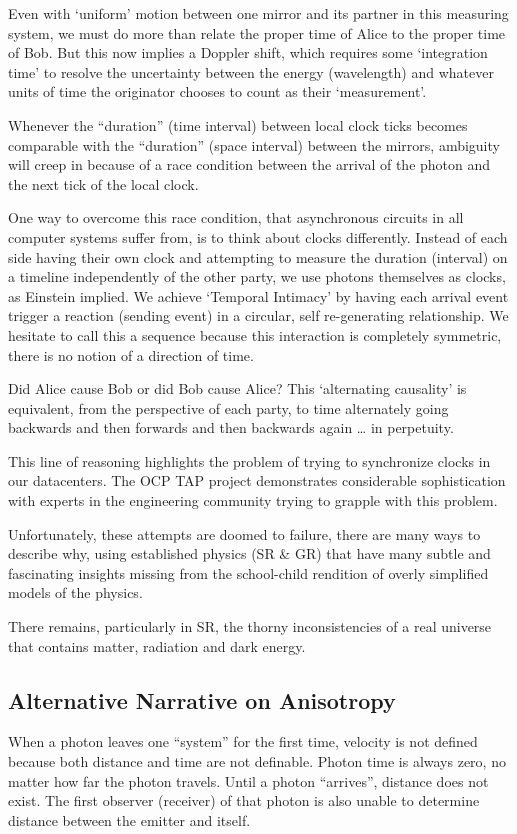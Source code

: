 Even with ‘uniform’ motion between one mirror and its partner in this measuring system, we must do more than relate the proper time of Alice to the proper time of Bob. But this now implies a Doppler shift, which requires some ‘integration time’ to resolve the uncertainty between the energy (wavelength) and whatever units of time the originator chooses to count as their ‘measurement’.

Whenever the “duration” (time interval) between local clock ticks becomes comparable with the “duration” (space interval) between the mirrors, ambiguity will creep in because of a race condition between the arrival of the photon and the next tick of the local clock.

One way to overcome this race condition, that asynchronous circuits in all computer systems suffer from, is to think about clocks differently. Instead of each side having their own clock and attempting to measure the duration (interval) on a timeline independently of the other party, we use photons themselves as clocks, as Einstein implied. We achieve ‘Temporal Intimacy’ by having each arrival event trigger a reaction (sending event) in a circular, self re-generating relationship. We hesitate to call this a sequence because this interaction is completely symmetric, there is no notion of a direction of time.

Did Alice cause Bob or did Bob cause Alice? This ‘alternating causality’ is equivalent, from the perspective of each party, to time alternately going backwards and then forwards and then backwards again …  in perpetuity.

This line of reasoning highlights the problem of trying to synchronize clocks in our datacenters. The OCP TAP project demonstrates considerable sophistication with experts in the engineering community trying to grapple with this problem.

Unfortunately, these attempts are doomed to failure, there are many ways to describe why, using established physics (SR \& GR) that have many subtle and fascinating insights missing from the school-child rendition of overly simplified models of the physics.

There remains, particularly in SR, the thorny inconsistencies of a real universe that contains matter, radiation and dark energy.

\subsection{Alternative Narrative on Anisotropy}
When a photon leaves one “system” for the first time, velocity is not defined because both distance and time are not definable. Photon time is always zero, no matter how far the photon travels. Until a photon “arrives”, distance does not exist. The first observer (receiver) of that photon is also unable to determine distance between the emitter and itself. 

